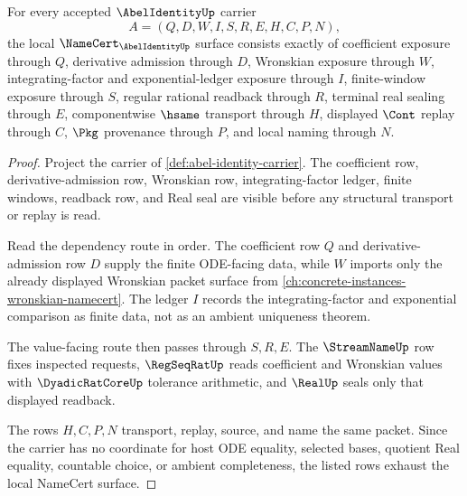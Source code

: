 \begin{theorem}
\label{thm:abel-identity-namecert-obligations}
For every accepted $\AbelIdentityUp$ carrier
$$
A=(Q,D,W,I,S,R,E,H,C,P,N),
$$
the local $\NameCert_{\AbelIdentityUp}$ surface consists exactly of coefficient exposure through $Q$, derivative admission through $D$, Wronskian exposure through $W$, integrating-factor and exponential-ledger exposure through $I$, finite-window exposure through $S$, regular rational readback through $R$, terminal real sealing through $E$, componentwise $\hsame$ transport through $H$, displayed $\Cont$ replay through $C$, $\Pkg$ provenance through $P$, and local naming through $N$.
\end{theorem}
\begin{proof}
Project the carrier of \autoref{def:abel-identity-carrier}. The coefficient row, derivative-admission row, Wronskian row, integrating-factor ledger, finite windows, readback row, and Real seal are visible before any structural transport or replay is read.

Read the dependency route in order. The coefficient row $Q$ and derivative-admission row $D$ supply the finite ODE-facing data, while $W$ imports only the already displayed Wronskian packet surface from \autoref{ch:concrete-instances-wronskian-namecert}. The ledger $I$ records the integrating-factor and exponential comparison as finite data, not as an ambient uniqueness theorem.

The value-facing route then passes through $S,R,E$. The $\StreamNameUp$ row fixes inspected requests, $\RegSeqRatUp$ reads coefficient and Wronskian values with $\DyadicRatCoreUp$ tolerance arithmetic, and $\RealUp$ seals only that displayed readback.

The rows $H,C,P,N$ transport, replay, source, and name the same packet. Since the carrier has no coordinate for host ODE equality, selected bases, quotient Real equality, countable choice, or ambient completeness, the listed rows exhaust the local NameCert surface.
\end{proof}



